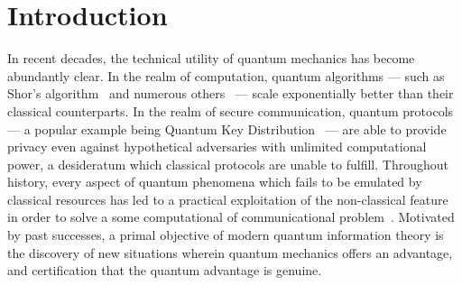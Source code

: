 \documentclass[aps, 10pt, english, twoside, pra, nofootinbib, tightenlines, longbibliography, superscriptaddress]{revtex4-1}
\begin{document}
    \section{Introduction}
    \label{sec:introduction}
    In recent decades, the technical utility of quantum mechanics has become abundantly clear. In the realm of computation, quantum algorithms --- such as Shor's algorithm~\cite{Shor_1997} and numerous others~\cite{Jordan_2016} --- scale exponentially better than their classical counterparts. In the realm of secure communication, quantum protocols --- a popular example being Quantum Key Distribution~\cite{Bennett_2014} --- are able to provide privacy even against hypothetical adversaries with unlimited computational power, a desideratum which classical protocols are unable to fulfill. Throughout history, every aspect of quantum phenomena which fails to be emulated by classical resources has led to a practical exploitation of the non-classical feature in order to solve a some computational of communicational problem~\cite{Neilsen_Chaung_2011}. Motivated by past successes, a primal objective of modern quantum information theory is the discovery of new situations wherein quantum mechanics offers an advantage, and certification that the quantum advantage is genuine.
\end{document}
